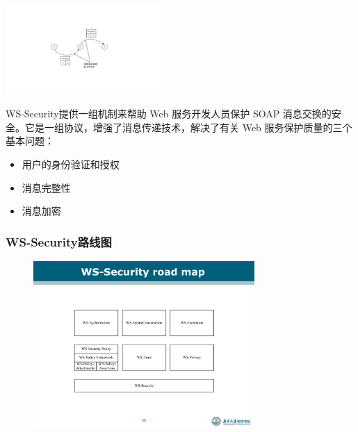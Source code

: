 \begin{table}
    \centering
    \vspace{-3.5em}
    \includegraphics[width=0.45\textwidth]{images/使用基本授权和HTTPS.pdf}
    \vspace{-1.5em}
\end{table}
WS-Security提供一组机制来帮助 Web 服务开发人员保护 SOAP 消息交换的安全。它是一组协议，增强了消息传递技术，解决了有关 Web 服务保护质量的三个基本问题：
\begin{itemize}
    \item 用户的身份验证和授权
    \item 消息完整性
    \item 消息加密
\end{itemize}

\subsubsection{WS-Security路线图}
\begin{figure}[H]
    \vspace{-0.5em}
	\centering
	\includegraphics[width=0.75\textwidth]{images/WS-Security路线图.pdf}
    \vspace{-1.5em}
\end{figure}

